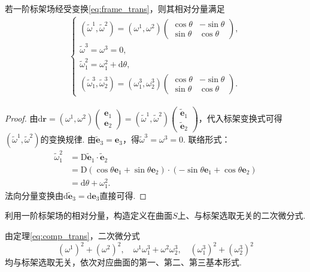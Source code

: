 \documentclass[../../main.tex]{subfiles}%
\begin{document}
\begin{theorem}
若一阶标架场经受变换\eqref{eq:frame_trans}，则其相对分量满足
\begin{align}
\begin{cases}
(\tilde{\omega}^1,\tilde{\omega}^2) = (\omega^1,\omega^2)\begin{pmatrix}
\cos\theta & -\sin\theta \\
\sin\theta & \cos\theta
\end{pmatrix}, \\
\tilde{\omega}^3 = \omega^3 = 0, \\
\tilde{\omega}_1^2 = \omega_1^2 + \mathrm{d}\theta, \\
(\tilde{\omega}_1^3,\tilde{\omega}_2^3) = (\omega_1^3,\omega_2^3)\begin{pmatrix}
\cos\theta & -\sin\theta \\
\sin\theta & \cos\theta
\end{pmatrix}.
\end{cases} \label{eq:comp_trans}
\end{align}
\end{theorem}

\begin{proof}

由$\mathrm{d}\boldsymbol{r}=(\omega^1,\omega^2)\begin{pmatrix}\boldsymbol{e}_1\\\boldsymbol{e}_2\end{pmatrix}=(\tilde{\omega}^1,\tilde{\omega}^2)\begin{pmatrix}\tilde{\boldsymbol{e}}_1\\\tilde{\boldsymbol{e}}_2\end{pmatrix}$，代入标架变换式可得$(\tilde{\omega}^1,\tilde{\omega}^2)$的变换规律.
由$\tilde{\boldsymbol{e}}_3=\boldsymbol{e}_3$，得$\tilde{\omega}^3=\omega^3=0$.
联络形式：
\begin{align*}
\tilde{\omega}_1^2 &= \mathrm{D}\tilde{\boldsymbol{e}}_1\cdot\tilde{\boldsymbol{e}}_2 \\
&= \mathrm{D}(\cos\theta\boldsymbol{e}_1+\sin\theta\boldsymbol{e}_2)\cdot(-\sin\theta\boldsymbol{e}_1+\cos\theta\boldsymbol{e}_2) \\
&= \mathrm{d}\theta + \omega_1^2.
\end{align*}
法向分量变换由$\mathrm{d}\tilde{\boldsymbol{e}}_3=\mathrm{d}\boldsymbol{e}_3$直接可得.

\end{proof}

\begin{example}
利用一阶标架场的相对分量，构造定义在曲面$S$上、与标架选取无关的二次微分式.
\begin{solution}

由定理\eqref{eq:comp_trans}，二次微分式
$$(\omega^1)^2+(\omega^2)^2,\quad \omega^1\omega_1^3+\omega^2\omega_2^3,\quad (\omega_1^3)^2+(\omega_2^3)^2$$
均与标架选取无关，依次对应曲面的第一、第二、第三基本形式.

\end{solution}
\end{example}
\end{document}
